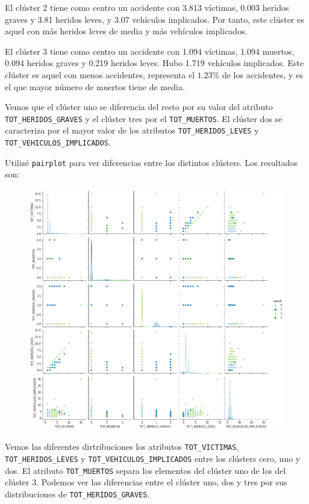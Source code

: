 \documentclass[a4]{article}
\begin{document}
El clúster 2 tiene como centro un accidente con 3.813 víctimas, 0.003 heridos graves y 3.81 heridos leves, y 3.07 vehículos implicados. Por tanto, este clúster es aquel con más heridos leves de media y más vehículos implicados.

El clúster 3 tiene como centro un accidente con 1.094 víctimas, 1.094 muertos, 0.094 heridos graves y 0.219 heridos leves. Hubo 1.719 vehículos implicados. Este clúster es aquel con menos accidentes, representa el $1.23\%$ de los accidentes, y es el que mayor número de muertos tiene de media.

Vemos que el clúster uno se diferencia del resto por su valor del atributo \texttt{TOT\_HERIDOS\_GRAVES} y el clúster tres por el \texttt{TOT\_MUERTOS}. El clúster dos se caracteriza por el mayor valor de los atributos \texttt{TOT\_HERIDOS\_LEVES} y \\\texttt{TOT\_VEHICULOS\_IMPLICADOS}.

Utilizé \texttt{pairplot} para ver diferencias entre los distintos clústers. Los resultados son:

\begin{figure}[H]
  \centering
  \includegraphics[width=170mm]{imagenes/c3_kmeans_pairplot}
\end{figure}

Vemos las diferentes dirtribuciones los atributos \texttt{TOT\_VICTIMAS}, \texttt{TOT\_HERIDOS\_LEVES} y \texttt{TOT\_VEHICULOS\_IMPLICADOS} entre los clústers cero, uno y dos. El atributo \texttt{TOT\_MUERTOS} separa los elementos del clúster uno de los del clúster 3. Podemos ver las diferencias entre el clúster uno, dos y tres por sus distribuciones de \texttt{TOT\_HERIDOS\_GRAVES}.
\end{document}
